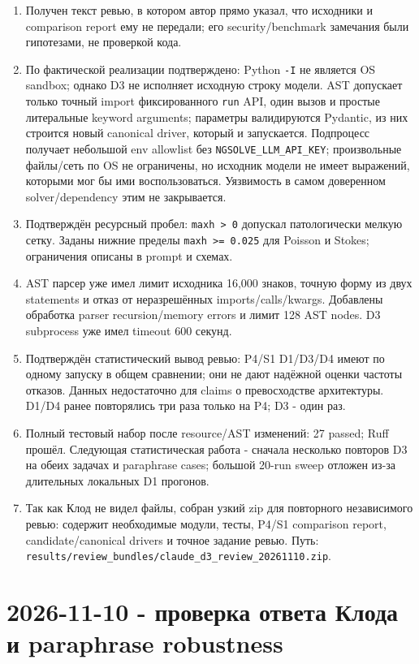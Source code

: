 \documentclass[11pt,a4paper]{article}
\begin{document}
\begin{enumerate}
    \item Получен текст ревью, в котором автор прямо указал, что исходники и comparison report ему не передали; его security/benchmark замечания были гипотезами, не проверкой кода.
    \item По фактической реализации подтверждено: Python \texttt{-I} не является OS sandbox; однако D3 не исполняет исходную строку модели. AST допускает только точный import фиксированного \texttt{run} API, один вызов и простые литеральные keyword arguments; параметры валидируются Pydantic, из них строится новый canonical driver, который и запускается. Подпроцесс получает небольшой env allowlist без \texttt{NGSOLVE\_LLM\_API\_KEY}; произвольные файлы/сеть по OS не ограничены, но исходник модели не имеет выражений, которыми мог бы ими воспользоваться. Уязвимость в самом доверенном solver/dependency этим не закрывается.
    \item Подтверждён ресурсный пробел: \texttt{maxh > 0} допускал патологически мелкую сетку. Заданы нижние пределы \texttt{maxh >= 0.025} для Poisson и Stokes; ограничения описаны в prompt и схемах.
    \item AST парсер уже имел лимит исходника 16,000 знаков, точную форму из двух statements и отказ от неразрешённых imports/calls/kwargs. Добавлены обработка parser recursion/memory errors и лимит 128 AST nodes. D3 subprocess уже имел timeout 600 секунд.
    \item Подтверждён статистический вывод ревью: P4/S1 D1/D3/D4 имеют по одному запуску в общем сравнении; они не дают надёжной оценки частоты отказов. Данных недостаточно для claims о превосходстве архитектуры. D1/D4 ранее повторялись три раза только на P4; D3 - один раз.
    \item Полный тестовый набор после resource/AST изменений: 27 passed; Ruff прошёл. Следующая статистическая работа - сначала несколько повторов D3 на обеих задачах и paraphrase cases; большой 20-run sweep отложен из-за длительных локальных D1 прогонов.
    \item Так как Клод не видел файлы, собран узкий zip для повторного независимого ревью: содержит необходимые модули, тесты, P4/S1 comparison report, candidate/canonical drivers и точное задание ревью. Путь: \texttt{results/review\_bundles/claude\_d3\_review\_20261110.zip}.
\end{enumerate}

\section{2026-11-10 - проверка ответа Клода и paraphrase robustness}
\end{document}
